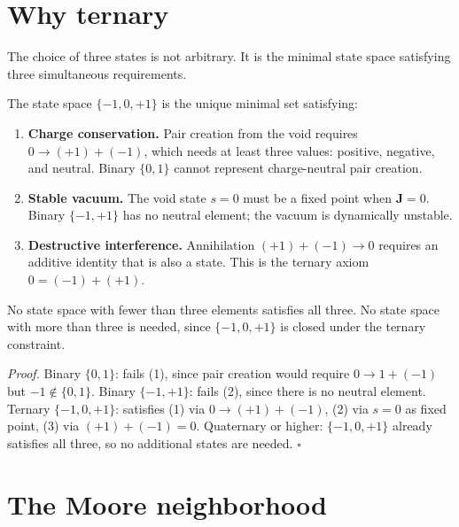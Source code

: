 \documentclass[
  11pt,
  letterpaper,
  twoside,
  openany]{book}
\makeatletter
\let\orig@section\section
\renewcommand{\section}{\needspace{8\baselineskip}\orig@section}
\makeatother
\begin{document}
\section{Why ternary}\label{sec-ternary}

The choice of three states is not arbitrary. It is the minimal state
space satisfying three simultaneous requirements.

\begin{ftdtheorem}

The state space \(\{-1, 0, +1\}\) is the unique minimal set satisfying:

\begin{enumerate}
\def\labelenumi{\arabic{enumi}.}
\item
  \textbf{Charge conservation.} Pair creation from the void requires
  \(0 \to (+1) + (-1)\), which needs at least three values: positive,
  negative, and neutral. Binary \(\{0, 1\}\) cannot represent
  charge-neutral pair creation.
\item
  \textbf{Stable vacuum.} The void state \(s = 0\) must be a fixed point
  when \(\mathbf{J} = 0\). Binary \(\{-1, +1\}\) has no neutral element;
  the vacuum is dynamically unstable.
\item
  \textbf{Destructive interference.} Annihilation \((+1) + (-1) \to 0\)
  requires an additive identity that is also a state. This is the
  ternary axiom \(0 = (-1) + (+1)\).
\end{enumerate}

No state space with fewer than three elements satisfies all three. No
state space with more than three is needed, since \(\{-1, 0, +1\}\) is
closed under the ternary constraint.

\end{ftdtheorem}

\emph{Proof.} Binary \(\{0, 1\}\): fails (1), since pair creation would
require \(0 \to 1 + (-1)\) but \(-1 \notin \{0,1\}\). Binary
\(\{-1, +1\}\): fails (2), since there is no neutral element. Ternary
\(\{-1, 0, +1\}\): satisfies (1) via \(0 \to (+1) + (-1)\), (2) via
\(s = 0\) as fixed point, (3) via \((+1) + (-1) = 0\). Quaternary or
higher: \(\{-1, 0, +1\}\) already satisfies all three, so no additional
states are needed. \(\square\)

\section{The Moore neighborhood}\label{the-moore-neighborhood}
\end{document}
